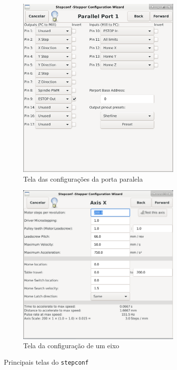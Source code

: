 \documentclass[
	article,			%
	11pt,				%
	oneside,			%
	a4paper,			%
	section=TITLE,		%
	english,			%
	brazil,				%
	sumario=tradicional
	]{abntex2}
\newcommand{\stepconf}{\texttt{stepconf}}
\begin{document}
\begin{figure}[H]
    \begin{subfigure}[b]{0.50\textwidth}
        \includegraphics[width=0.9\textwidth]{img/stepconf_parport.png}
        \caption{Tela das configurações da porta paralela}
        \label{fig:stepconf-parport-config}
    \end{subfigure}%
    \begin{subfigure}[b]{0.50\textwidth}
        \includegraphics[width=0.9\textwidth]{img/stepconf_xaxis.png}
        \caption{Tela da configuração de um eixo}
        \label{fig:stepconf-axis-config}
    \end{subfigure}
    \caption{Principais telas do \stepconf}
    \label{fig:stepconf}
    
\end{figure}
\end{document}
